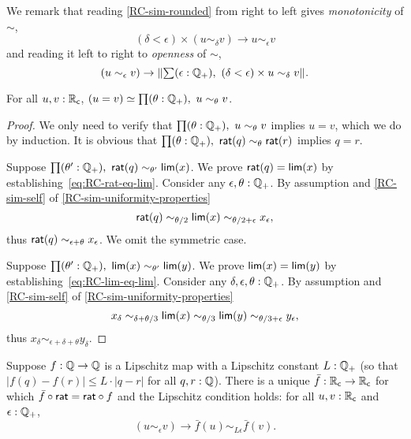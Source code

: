 \noindent
We remark that reading \autoref{RC-sim-rounded} from right to left gives
\emph{monotonicity} of $\sim$,
%
\begin{equation*}
  (\delta < \epsilon) \times (u \sim_\delta v) \to u \sim_\epsilon v
\end{equation*}
%
and reading it left to right to \emph{openness} of $\sim$,
%
\begin{equation*}
  (u \sim_\epsilon v) \to \brck{\sm{\epsilon : \Qp} (\delta < \epsilon) \times u \sim_\delta v}.
\end{equation*}

\begin{lem} \label{RC-weak-archimedean}
  For all $u, v : \mathbb{R}_\mathsf{c}$, $\eqv{(u = v)}{\prd{\theta : \Qp} u \sim_\theta v}$.
\end{lem}

\begin{proof}
  We only need to verify that $\prd{\theta : \Qp} u \sim_\theta v$ implies $u = v$,
  which we do by induction. It is obvious that $\prd{\theta : \Qp} \rcrat(q)
  \sim_\theta \rcrat(r)$ implies $q = r$.

  Suppose $\prd{\theta' : \Qp} \rcrat(q) \sim_{\theta'} \rclim(x)$. We prove $\mathsf{rat}(q) =
  \mathsf{lim}(x)$ by establishing~\eqref{eq:RC-rat-eq-lim}. Consider any $\epsilon, \theta :
  \mathbb{Q}_{+}$. By assumption and \autoref{RC-sim-self} of \autoref{RC-sim-uniformity-properties}
  \begin{equation*}
    \mathsf{rat}(q) \sim_{\theta/2} \mathsf{lim}(x) \sim_{\theta/2 + \epsilon} x_\epsilon,
  \end{equation*}
  thus $\mathsf{rat}(q) \sim_{\epsilon + \theta} x_\epsilon$. We omit the symmetric case.

  Suppose $\prd{\theta' : \Qp} \rclim(x) \sim_{\theta'} \rclim(y)$. We prove $\mathsf{lim}(x) =
  \mathsf{lim}(y)$ by establishing~\eqref{eq:RC-lim-eq-lim}. Consider any $\delta, \epsilon,
  \theta : \mathbb{Q}_{+}$. By assumption and \autoref{RC-sim-self} of
  \autoref{RC-sim-uniformity-properties}
  \begin{equation*}
    x_\delta \sim_{\delta + \theta/3}
    \mathsf{lim}(x) \sim_{\theta/3}
    \mathsf{lim}(y) \sim_{\theta/3 + \epsilon}
    y_\epsilon,
  \end{equation*}
  thus $x_\delta \sim_{\epsilon + \delta + \theta} y_\delta$.
\end{proof}


\begin{lem}\label{RC-extend-Q-Lipschitz}
  Suppose $f : \mathbb{Q} \to \mathbb{Q}$ is a Lipschitz map with a Lipschitz constant $L : \mathbb{Q}_{+}$ (so that
  $|f(q) - f(r)| \leq L \cdot |q - r|$ for all $q, r : \mathbb{Q}$). There is a unique $\bar{f} :
  \mathbb{R}_\mathsf{c} \to \mathbb{R}_\mathsf{c}$ for which $\bar{f} \circ \mathsf{rat} = \mathsf{rat} \circ f$ and the Lipschitz
  condition holds: for all $u, v : \mathbb{R}_\mathsf{c}$ and $\epsilon : \mathbb{Q}_{+}$,
  \begin{equation*}
    (u \sim_\epsilon v) \to \bar{f}(u) \sim_{L \epsilon} \bar{f}(v).
  \end{equation*}
\end{lem}

